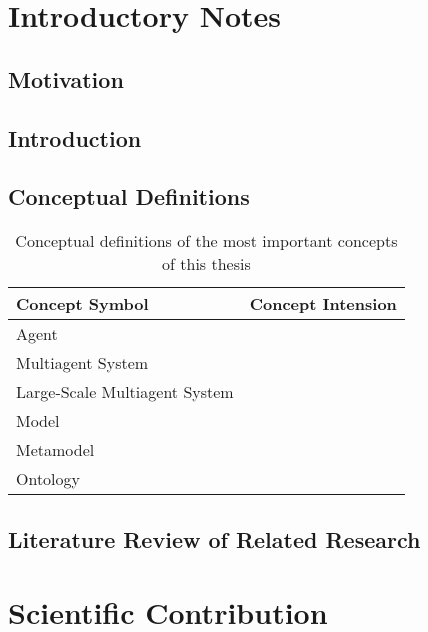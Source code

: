 \documentclass[12pt,a4paper,draft]{report}
\begin{document}
\pagebreak


\chapter{Introductory Notes}

\section{Motivation}

\section{Introduction}

\section{Conceptual Definitions}

\begin{table}[h]
    \centering
    \caption{Conceptual definitions of the most important concepts of this thesis}
    \label{tab:IntroConcepts}
    \begin{tabular}{p{4.5cm}|p{9cm}}
        \toprule
        \textbf{Concept Symbol} & \textbf{Concept Intension} \\\midrule
        Agent & \\
        Multiagent System & \\
        Large-Scale Multiagent System & \\
        Model & \\
        Metamodel & \\
        Ontology & \\
        \bottomrule
    \end{tabular}
\end{table}

\section{Literature Review of Related Research}

\clearpage
\chapter{Scientific Contribution}
\end{document}
